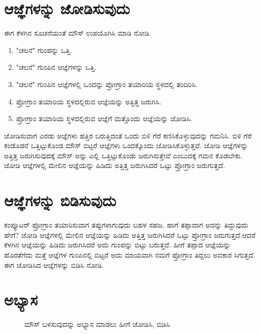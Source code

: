 \section{ಆಜ್ಞೆಗಳನ್ನು ಜೋಡಿಸುವುದು}
ಈಗ ಕೆಳಗಿನ ಸೂಚನೆಯಂತೆ ಮೌಸ್ ಉಪಯೊಗಿಸಿ ಮಾಡಿ ನೋಡಿ.  

\begin{enumerate}
\item{"ಚಲನೆ" ಗುಂಪನ್ನು ಒತ್ತಿ.}
\item{"ಚಲನೆ" ಗುಂಪಿನ ಆಜ್ಞೆಗಳನ್ನು ಒತ್ತಿ.}
\item{"ಚಲನೆ" ಗುಂಪಿನ ಆಜ್ಞೆಗಳಲ್ಲಿ ಒಂದನ್ನು ಪ್ರೋಗ್ರಾಂ ತಯಾರಿಯ ಸ್ಥಳದಲ್ಲಿ ತಂದಿರಿಸಿ.}
\item{ಪ್ರೋಗ್ರಾಂ ತಯಾರಿಯ ಸ್ಥಳದಲ್ಲಿರುವ ಆಜ್ಞೆಯನ್ನು ಅತ್ತಿತ್ತ ಜರುಗಿಸಿ.}
\item{ಪ್ರೋಗ್ರಾಂ ತಯಾರಿಯ ಸ್ಥಳದಲ್ಲಿರುವ ಆಜ್ಞೆಗೆ ಮತ್ತೊಂದು ಆಜ್ಞೆಯನ್ನು ಜೋಡಿಸಿ.}
\end{enumerate}

ಜೋಡಿಸುವಾಗ ಎರಡು ಆಜ್ಞೆಗಳು ಹತ್ತಿರ ಬರುತ್ತಿದಂತೆ ಒಂದು ಬಿಳಿ ಗೆರೆ ಕಣಿಸಿಕೊಳ್ಳುವುದನ್ನು ಗಮನಿಸಿ.  ಬಿಳಿ ಗೆರೆ ಕಂಡೊಡನೆ ಒತ್ತಿಟ್ಟುಕೊಂಡ ಮೌಸ್ ಬಿಟ್ಟರೆ ಆಜ್ಞೆಗಳು ಒಂದಕ್ಕೊಂದು ಜೋಡಿಸಿಕೊಳ್ಳುತ್ತವೆ.  ಜೋಡಿ ಆಜ್ಞೆಗಳನ್ನು ಅತ್ತಿತ್ತ ಜರುಗಿಸುವುದಕ್ಕೆ ಮೌಸ್  ಅನ್ನು ಎಲ್ಲಿ ಒತ್ತಿಟ್ಟುಕೊಂಡು ಜರುಗಿಸುತ್ತೇವೆ ಎಂಬುದಕ್ಕೆ ಗಮನ ಕೊಡಬೇಕು. ಜೋಡಿ ಆಜ್ಞೆಗಳಲ್ಲಿ ಮೇಲಿನ ಆಜ್ಞೆಯನ್ನು ಹಿಡಿದು ಅತ್ತಿತ್ತ ಜರುಗಿಸಿದರೆ ಒಟ್ಟು ಪ್ರೋಗ್ರಾಂ ಜರುಗುತ್ತದೆ.

\section{ಆಜ್ಞೆಗಳನ್ನು ಬಿಡಿಸುವುದು}
ಕಂಪ್ಯೂಟರ್ ಪ್ರೋಗ್ರಾಂ ತಯಾರಿಸುವಾಗ ತಪ್ಪುಗಳಾಗುವುದು ಬಹಳ ಸಹಜ. ಹಾಗೆ ತಪ್ಪಾದಾಗ ಅದನ್ನು ತಿದ್ದುವುದು ಹೇಗೆ? ಜೋಡಿ ಆಜ್ಞೆಗಳಲ್ಲಿ ಮೇಲಿನ ಆಜ್ಞೆಯನ್ನು ಹಿಡಿದು ಅತ್ತಿತ್ತ ಜರುಗಿಸಿದರೆ ಒಟ್ಟು ಪ್ರೋಗ್ರಾಂ ಜರುಗುತ್ತದೆ.ಆದರೆ ಕೆಳಗಿನ ಆಜ್ಞೆಯನ್ನು ಹಿಡಿದು ಜರುಗಿಸಿದರೆ ಅದು ಗುಂಪನ್ನು ಬಿಟ್ಟು ಬರುತ್ತದೆ. ಹೀಗೆ ತಪ್ಪಾದ ಆಜ್ಞೆಯನ್ನು ಹೊರತೆಗೆದು ಮತ್ತೆ ಆಜ್ಞೆಗಳ ಗುಂಪಿನಲ್ಲಿ ಬಿಟ್ಟರೆ ಅದು ಮಾಯವಾಗಿ ನಮಗೆ ಪ್ರೋಗ್ರಾಂ ತಿದ್ದಲು ಅವಕಾಶ ಸಿಗುತ್ತದೆ.  ಈಗ ಜೋಡಿಸಿದ  ಆಜ್ಞೆಗಳನ್ನು ಬಿಡಿಸಿ ನೋಡಿ.

\section{ಅಭ್ಯಾಸ}

\begin{figure}[h]
\begin{center}
\begin{Scratch}[1.2]
\end{Scratch}
\caption{ಮೌಸ್ ಬಳಸುವುದನ್ನು ಅಭ್ಯಾಸ ಮಾಡಲು ಹೀಗೆ ಜೋಡಿಸಿ,  ಬಿಡಿಸಿ}
\label{mouse1}
\end{center}
\end{figure}

